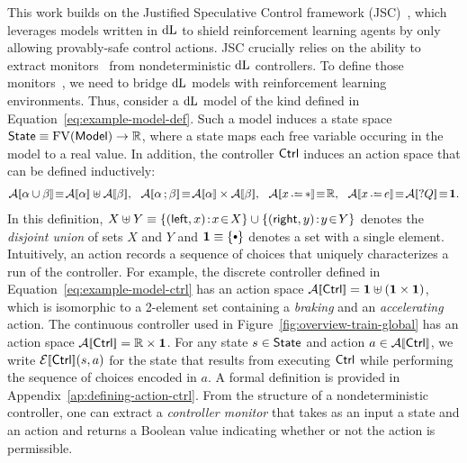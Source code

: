 \documentclass[acmsmall,screen,nonacm]{acmart}
\begin{document}
This work builds on the Justified Speculative Control framework (JSC)~\cite{DBLP:conf/aaai/FultonP18}, which leverages models written in $\mathop{}\!\mathrm{d} \text{L}$ to shield reinforcement learning agents by only allowing provably-safe control actions. JSC crucially relies on the ability to extract monitors~\cite{DBLP:journals/fmsd/MitschP16} from nondeterministic $\mathop{}\!\mathrm{d} \text{L}$ controllers. To define those monitors~\cite{DBLP:journals/fmsd/MitschP16}, we need to bridge $\mathop{}\!\mathrm{d} \text{L}$ models with reinforcement learning environments. Thus, consider a $\mathop{}\!\mathrm{d} \text{L}$ model of the kind defined in Equation~\ref{eq:example-model-def}. Such a model induces a state space $\mathsf{State} \equiv \operatorname{FV}(\mathsf{Model}) \to \mathbb{R}$, where a state maps each free variable occuring in the model to a real value. In addition, the controller $\mathsf{Ctrl}$ induces an action space that can be defined inductively:
\begin{gather*}
    \CtrlActionSem{\alpha \cup \beta} \!\equiv\! \CtrlActionSem{\alpha} \uplus \CtrlActionSem{\beta}, \ \
    \CtrlActionSem{\alpha \seqI \beta} \!\equiv\! \CtrlActionSem{\alpha} \times \CtrlActionSem{\beta}, \ \
    \CtrlActionSem{x \dlassign *} \!\equiv\! \Reals, \ \
    \CtrlActionSem{x \dlassign e} \!\equiv\! \CtrlActionSem{?Q} \!\equiv\! \UnitSet.
\end{gather*}
In this definition, $X \uplus Y \equiv \{(\SumLeft, x) \!:\! x \!\in\! X\} \cup \{(\SumRight, y) \!:\! y \!\in\! Y\}$ denotes the \emph{disjoint union} of sets $X$ and $Y$ and $\UnitSet \equiv \{\Unit\}$ denotes a set with a single element. Intuitively, an action records a sequence of choices that uniquely characterizes a run of the controller.
For example, the discrete controller defined in Equation~\ref{eq:example-model-ctrl} has an action space $\CtrlActionSem{\Ctrl} = \UnitSet \uplus (\UnitSet \times \UnitSet)$, which is isomorphic to a 2-element set containing a \textit{braking} and an \textit{accelerating} action.
The continuous controller used in Figure~\ref{fig:overview-train-global} has an action space $\CtrlActionSem{\Ctrl} = \Reals \times \UnitSet$.
For any state $s \in \mathsf{State}$ and action $a \in \CtrlActionSem{\Ctrl}$, we write $\CtrlExeSem{\Ctrl}(s, a)$ for the state that results from executing $\mathsf{Ctrl}$ while performing the sequence of choices encoded in $a$. A formal definition is provided in Appendix~\ref{ap:defining-action-ctrl}. From the structure of a nondeterministic controller, one can extract a \emph{controller monitor} that takes as an input a state and an action and returns a Boolean value indicating whether or not the action is permissible.
\end{document}
